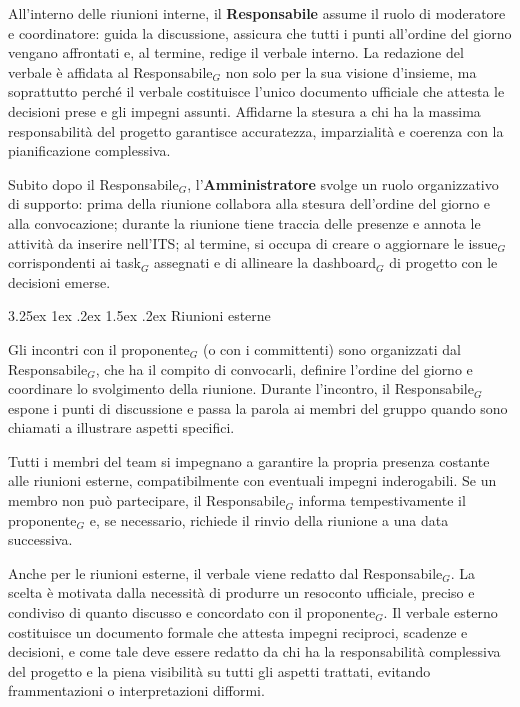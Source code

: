 \documentclass[a4paper, 10pt]{article}
\makeatletter
\renewcommand\paragraph{\@startsection{paragraph}{4}{\z@}%
  {3.25ex \@plus1ex \@minus .2ex}%
  {1.5ex \@plus .2ex}%
  {\normalfont\normalsize\bfseries}}
\makeatother
\begin{document}
All'interno delle riunioni interne, il \textbf{Responsabile} assume il ruolo di moderatore e coordinatore: guida la discussione, assicura che tutti i punti all'ordine del giorno vengano affrontati e, al termine, redige il verbale interno. La redazione del verbale è affidata al Responsabile$_G$ non solo per la sua visione d'insieme, ma soprattutto perché il verbale costituisce l'unico documento ufficiale che attesta le decisioni prese e gli impegni assunti. Affidarne la stesura a chi ha la massima responsabilità del progetto garantisce accuratezza, imparzialità e coerenza con la pianificazione complessiva.

Subito dopo il Responsabile$_G$, l'\textbf{Amministratore} svolge un ruolo organizzativo di supporto: prima della riunione collabora alla stesura dell'ordine del giorno e alla convocazione; durante la riunione tiene traccia delle presenze e annota le attività da inserire nell'ITS; al termine, si occupa di creare o aggiornare le issue$_G$ corrispondenti ai task$_G$ assegnati e di allineare la dashboard$_G$ di progetto con le decisioni emerse.

\paragraph{Riunioni esterne}

Gli incontri con il proponente$_G$ (o con i committenti) sono organizzati dal Responsabile$_G$, che ha il compito di convocarli, definire l'ordine del giorno e coordinare lo svolgimento della riunione. Durante l'incontro, il Responsabile$_G$ espone i punti di discussione e passa la parola ai membri del gruppo quando sono chiamati a illustrare aspetti specifici.

Tutti i membri del team si impegnano a garantire la propria presenza costante alle riunioni esterne, compatibilmente con eventuali impegni inderogabili. Se un membro non può partecipare, il Responsabile$_G$ informa tempestivamente il proponente$_G$ e, se necessario, richiede il rinvio della riunione a una data successiva.

Anche per le riunioni esterne, il verbale viene redatto dal Responsabile$_G$. La scelta è motivata dalla necessità di produrre un resoconto ufficiale, preciso e condiviso di quanto discusso e concordato con il proponente$_G$. Il verbale esterno costituisce un documento formale che attesta impegni reciproci, scadenze e decisioni, e come tale deve essere redatto da chi ha la responsabilità complessiva del progetto e la piena visibilità su tutti gli aspetti trattati, evitando frammentazioni o interpretazioni difformi.
\end{document}
